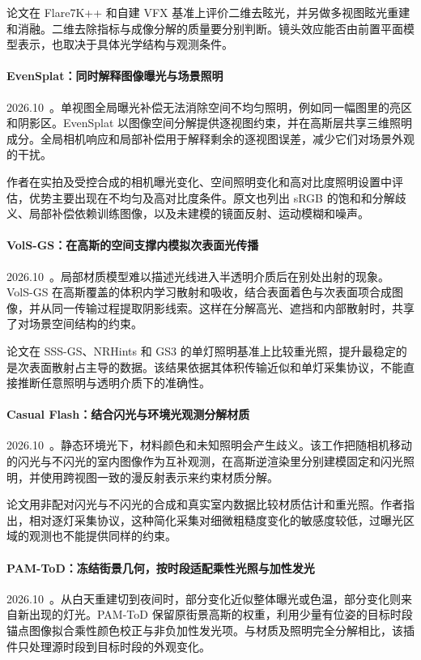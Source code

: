 论文在 Flare7K++ 和自建 VFX 基准上评价二维去眩光，并另做多视图眩光重建和消融。二维去除指标与成像分解的质量要分别判断。镜头效应能否由前置平面模型表示，也取决于具体光学结构与观测条件。

\paragraph{EvenSplat：同时解释图像曝光与场景照明}
2026.10~\cite{2610_01876}。单视图全局曝光补偿无法消除空间不均匀照明，例如同一幅图里的亮区和阴影区。EvenSplat 以图像空间分解提供逐视图约束，并在高斯层共享三维照明成分。全局相机响应和局部补偿用于解释剩余的逐视图误差，减少它们对场景外观的干扰。

作者在实拍及受控合成的相机曝光变化、空间照明变化和高对比度照明设置中评估，优势主要出现在不均匀及高对比度条件。原文也列出 sRGB 的饱和和分解歧义、局部补偿依赖训练图像，以及未建模的镜面反射、运动模糊和噪声。

\paragraph{VolS-GS：在高斯的空间支撑内模拟次表面光传播}
2026.10~\cite{2610_04007}。局部材质模型难以描述光线进入半透明介质后在别处出射的现象。VolS-GS 在高斯覆盖的体积内学习散射和吸收，结合表面着色与次表面项合成图像，并从同一传输过程提取阴影线索。这样在分解高光、遮挡和内部散射时，共享了对场景空间结构的约束。

论文在 SSS-GS、NRHints 和 GS3 的单灯照明基准上比较重光照，提升最稳定的是次表面散射占主导的数据。该结果依据其体积传输近似和单灯采集协议，不能直接推断任意照明与透明介质下的准确性。

\paragraph{Casual Flash：结合闪光与环境光观测分解材质}
2026.10~\cite{2610_06035}。静态环境光下，材料颜色和未知照明会产生歧义。该工作把随相机移动的闪光与不闪光的室内图像作为互补观测，在高斯逆渲染里分别建模固定和闪光照明，并使用跨视图一致的漫反射表示来约束材质分解。

论文用非配对闪光与不闪光的合成和真实室内数据比较材质估计和重光照。作者指出，相对逐灯采集协议，这种简化采集对细微粗糙度变化的敏感度较低，过曝光区域的观测也不能提供同样的约束。

\paragraph{PAM-ToD：冻结街景几何，按时段适配乘性光照与加性发光}
2026.10~\cite{2610_11572}。从白天重建切到夜间时，部分变化近似整体曝光或色温，部分变化则来自新出现的灯光。PAM-ToD 保留原街景高斯的权重，利用少量有位姿的目标时段锚点图像拟合乘性颜色校正与非负加性发光项。与材质及照明完全分解相比，该插件只处理源时段到目标时段的外观变化。

